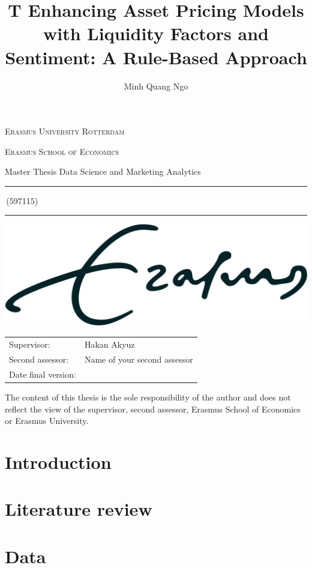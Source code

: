 \documentclass[a4paper,11pt]{article}
\author{Minh Quang Ngo}
\title{T Enhancing Asset Pricing Models with Liquidity Factors and Sentiment: A Rule-Based Approach}
\newcommand{\studentnumber}{597115}
\newcommand{\program}{Data Science and Marketing Analytics}
\newcommand{\supervisor}{Hakan Akyuz}
\newcommand{\secondassesor}{Name of your second assessor}
\begin{document}
\begin{titlepage}
\makeatletter
\begin{center}
	\textsc{Erasmus University Rotterdam}
	\par \textsc{Erasmus School of Economics}
	\par Master Thesis \program

	\vfill \hrule height .08em \bigskip
	\par\huge\@title\bigskip
	\par\Large\@author\,(\studentnumber)\bigskip
	\hrule height .08em\normalsize
	
	\vfill
	\includegraphics[width=\textwidth,height=0.15\textheight,keepaspectratio]{eur} %
	\vfill
	
	\begin{tabular}{ll}
		\toprule
		Supervisor: & \supervisor\\
		Second assessor: & \secondassesor\\
		Date final version: & \@date\\
		\bottomrule
	\end{tabular}
	
	\vfill
	The content of this thesis is the sole responsibility of the author and does not reflect the view of the supervisor, second assessor, Erasmus School of Economics or Erasmus University.
\end{center}
\makeatother
\end{titlepage}

\section{Introduction}
    
\section{Literature review}
	
\section{Data}
	
\end{document}
